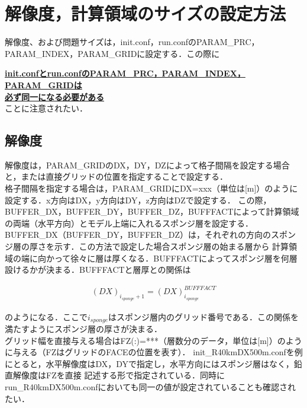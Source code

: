 




\section{解像度，計算領域のサイズの設定方法} \label{sec:adv_resolution}
解像度、および問題サイズは，init.conf，run.confのPARAM\_PRC，PARAM\_INDEX，PARAM\_GRIDに設定する．この際に

\underline{{\bf init.confとrun.confのPARAM\_PRC，PARAM\_INDEX，PARAM\_GRIDは}}\\
\underline{{\bf 必ず同一になる必要がある}}\\
ことに注意されたい．\\

\subsection{解像度}
解像度は，PARAM\_GRIDのDX，DY，DZによって格子間隔を設定する場合と，または直接グリッドの位置を指定することで設定する．\\
格子間隔を指定する場合は，PARAM\_GRIDにDX=xxx（単位は[m]）のように設定する．x方向はDX，y方向はDY，z方向はDZで設定する．
この際，BUFFER\_DX，BUFFER\_DY，BUFFER\_DZ，BUFFFACTによって計算領域の両端（水平方向）とモデル上端に入れるスポンジ層を設定する．
BUFFER\_DX（BUFFER\_DY，BUFFER\_DZ）は，それぞれの方向のスポンジ層の厚さを示す．この方法で設定した場合スポンジ層の始まる層から
計算領域の端に向かって徐々に層は厚くなる．BUFFFACTによってスポンジ層を何層設けるかが決まる．BUFFFACTと層厚との関係は

\begin{eqnarray}
(DX)_{i_{sponge}+1}=(DX)_{i_{sponge}}^{BUFFFACT}
\label{eq3.1}
\end{eqnarray}

のようになる．ここで$i_{sponge}$はスポンジ層内のグリッド番号である．この関係を満たすようにスポンジ層の厚さが決まる．\\
グリッド幅を直接与える場合はFZ(:)=***（層数分のデータ，単位は[m]）のように与える（FZはグリッドのFACEの位置を表す）．
init\_R40kmDX500m.confを例にとると，水平解像度はDX，DYで指定し，水平方向にはスポンジ層はなく，鉛直解像度はFZを直接
記述する形で指定されている．同時にrun\_R40kmDX500m.confにおいても同一の値が設定されていることも確認されたい．


